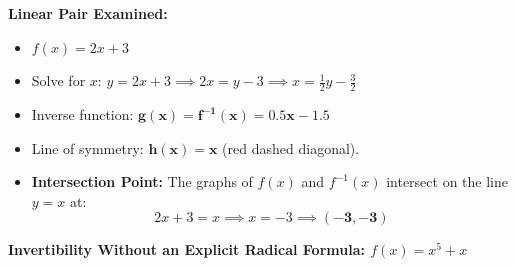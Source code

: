 \documentclass[10.5pt]{article}
\begin{document}
\begin{minipage}[c]{0.52\textwidth}
  \textbf{Linear Pair Examined:}
  \begin{itemize}[leftmargin=1.2em, label=$\bullet$, topsep=1pt, itemsep=2pt]
    \item $f(x) = 2x + 3$
    \item Solve for $x$: $y = 2x + 3 \implies 2x = y - 3 \implies x = \frac{1}{2}y - \frac{3}{2}$
    \item Inverse function: $\mathbf{g(x) = f^{-1}(x) = 0.5x - 1.5}$
    \item Line of symmetry: $\mathbf{h(x) = x}$ (red dashed diagonal).
    \item \textbf{Intersection Point:} The graphs of $f(x)$ and $f^{-1}(x)$ intersect on the line $y = x$ at:
    \[
      2x + 3 = x \implies x = -3 \implies \mathbf{(-3, -3)}
    \]
  \end{itemize}
\end{minipage}%
\hfill
\begin{minipage}[c]{0.45\textwidth}
  \centering
\end{minipage}

\vspace{0.04in}

\textbf{\large Invertibility Without an Explicit Radical Formula: $f(x) = x^5 + x$}
\end{document}
